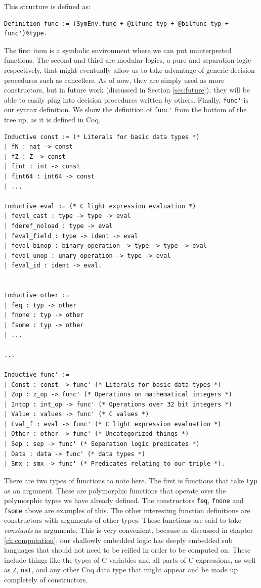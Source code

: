 \documentclass{puthesis}
\begin{document}
This structure is defined as:

\begin{lstlisting}
Definition func := (SymEnv.func + @ilfunc typ + @bilfunc typ + func')%type.
\end{lstlisting}

The first item is a symbolic environment where we can put
uninterpreted functions. The second and third are modular logics, a
pure and separation logic respectively, that might eventually allow us
to take advantage of generic decision procedures such as
cancellers. As of now, they are simply used as more constructors, but
in future work (discussed in Section \ref{sec:future}), they will be
able to easily plug into decision procedures written by others.
Finally, \lstinline|func'| is our syntax definition. We show the
definition of \lstinline|func'| from the bottom of the tree up, as
it is defined in Coq.

\begin{lstlisting}
Inductive const := (* Literals for basic data types *)
| fN : nat -> const
| fZ : Z -> const
| fint : int -> const
| fint64 : int64 -> const
| ...

Inductive eval := (* C light expression evaluation *)
| feval_cast : type -> type -> eval
| fderef_noload : type -> eval
| feval_field : type -> ident -> eval
| feval_binop : binary_operation -> type -> type -> eval
| feval_unop : unary_operation -> type -> eval
| feval_id : ident -> eval.


Inductive other := 
| feq : typ -> other
| fnone : typ -> other
| fsome : typ -> other
| ...

...

Inductive func' :=
| Const : const -> func' (* Literals for basic data types *)
| Zop : z_op -> func' (* Operations on mathematical integers *)
| Intop : int_op -> func' (* Operations over 32 bit integers *)
| Value : values -> func' (* C values *)
| Eval_f : eval -> func' (* C light expression evaluation *)
| Other : other -> func' (* Uncategorized things *)
| Sep : sep -> func' (* Separation logic predicates *)
| Data : data -> func' (* data types *)
| Smx : smx -> func' (* Predicates relating to our triple *).

\end{lstlisting}

There are two types of functions to note here. The first is functions
that take \lstinline|typ| as an argument. These are polymorphic
functions that operate over the polymorphic types we have
already defined. The constructors \lstinline|feq|, \lstinline|fnone|
and \lstinline|fsome| above are examples of this. The other
interesting function definitions are constructors with arguments of
other types. These functions are said to take \emph{constants} as
arguments. This is very convenient, because as discussed in chapter
\ref{ch:computation}, our shallowly embedded logic has deeply embedded
sub languages that should not need to be reified
in order to be computed on. These include things like the types of C
variables and all parts of C expressions, as well as \lstinline|Z|,
\lstinline|nat|, and any other Coq data type that might appear and be
made up completely of constructors.
\end{document}
